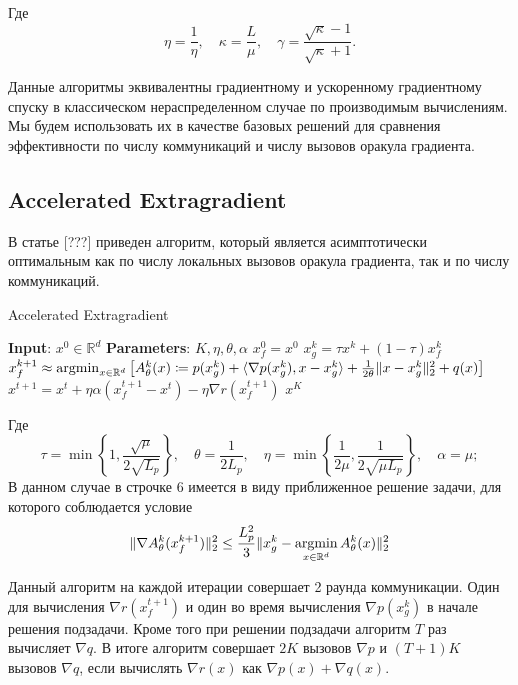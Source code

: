 \documentclass[a4paper,12pt]{extarticle}
\newcommand{\argmin}{\mathop{\rm argmin}}
\newcommand{\eqdef}{\coloneqq}
\def\<#1,#2>{\langle #1,#2\rangle}
\newcommand{\norm}[1]{\|#1\|_{2}}
\newcommand{\sqn}[1]{\norm{#1}^2}
\begin{document}
Где
$$ 
\textstyle
\eta = \frac{1}{\eta},
\quad \kappa = \frac{L}{\mu},
\quad \gamma = \frac{\sqrt{\kappa} - 1}{\sqrt{\kappa} + 1}.
$$

Данные алгоритмы эквивалентны градиентному и ускоренному градиентному спуску в
классическом нераспределенном случае по производимым вычислениям.
Мы будем использовать их в качестве базовых решений для сравнения эффективности по числу коммуникаций и
числу вызовов оракула градиента.


\subsection{Accelerated Extragradient}

В статье [???] приведен алгоритм,
который является асимптотически оптимальным как по числу локальных вызовов оракула градиента,
так и по числу коммуникаций. 


\begin{algorithm}[]
    \caption{Accelerated Extragradient}
    \begin{algorithmic}[1]

    \STATE{} \textbf{Input}: $x^0 \in \mathbb{R}^d$
    \STATE{} \textbf{Parameters}: $K, \eta, \theta, \alpha$
    \STATE{} $x_f^0 = x^0$
    \STATE{} $x_g^k = \tau x^k + (1-\tau)x^k_f$
    \STATE{} $x_f^{k+1} \approx \argmin_{x \in \R^d}\left[ A_\theta^k(x) \eqdef p(x_g^k) + \<\nabla p(x_g^k),x - x_g^k> + \frac{1}{2\theta}\sqn{x - x_g^k} + q(x)\right]$
    \STATE{} $x^{t+1} = x^t + \eta\alpha (x_f^{t+1}  - x^t)- \eta \nabla r(x_f^{t+1})$
    \ENDFOR{}
    \RETURN{} $x^{K}$
    \end{algorithmic}
\end{algorithm}

Где $$ \textstyle
\tau = \min\left\{1,\frac{\sqrt{\mu}}{2\sqrt{L_p}}\right\},
\quad \theta = \frac{1}{2L_p},
\quad  \eta = \min \left\{\frac{1}{2\mu},\frac{1}{2\sqrt{\mu L_p}}\right\},
\quad \alpha = \mu;
$$
В данном случае в строчке 6 имеется в виду приближенное решение задачи, для которого соблюдается условие 
\[	\sqn{\nabla A_\theta^k(x_f^{k+1})} \leq  \frac{L_p^2}{3}\sqn{x_g^k- \argmin_{x \in \R^d} A_\theta^k(x)}\]


Данный алгоритм на каждой итерации совершает 2 раунда коммуникации.
Один для вычисления $\nabla r(x_f^{t + 1})$ и один во время вычисления $\nabla p(x_g^k)$  
в начале решения подзадачи. Кроме того при решении подзадачи алгоритм $T$ раз вычисляет $\nabla q$. В итоге алгоритм совершает \textbf{$2K$} вызовов \textbf{$\nabla p$} и $(T + 1)K$ вызовов $\nabla q$,
если вычислять $\nabla r(x)$ как  $\nabla p(x) + \nabla q(x)$.
\end{document}
